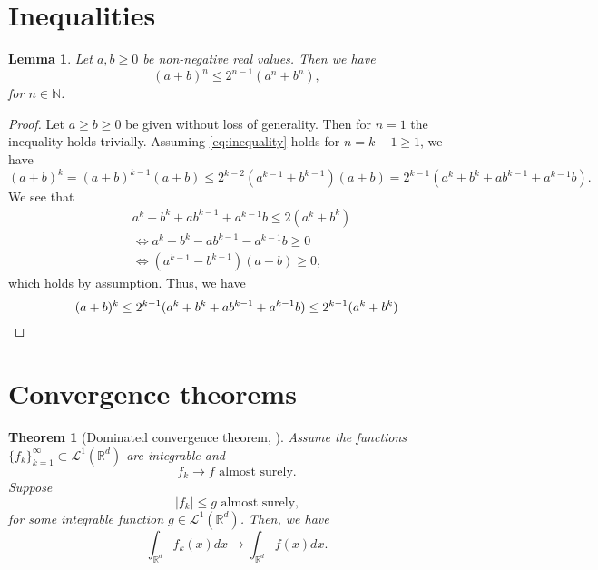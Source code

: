 \documentclass[12pt]{article}
\newtheorem{theorem}{Theorem}[section]
\newtheorem{lemma}[lemma]{Lemma}
\theoremstyle{definition}
\numberwithin{equation}{section}
\newcommand{\N}{\mathbb{N}}
\newcommand{\R}{\mathbb{R}}
\newcommand{\CL}{\mathcal{L}}
\begin{document}
\appendix
\section{Inequalities}
\begin{lemma}
  \label{lemma:inequality}
  Let $a,b \geq 0$ be non-negative real values. Then we have
  \begin{equation}
    \label{eq:inequality}
    \left(a+b\right)^n \leq 2^{n-1} \left( a^n + b^n \right),
  \end{equation}
  for $n \in \N$.
\end{lemma}
\begin{proof}
  Let $a \geq b \geq 0$ be given without loss of generality. Then for $n = 1$ the inequality holds trivially.
  Assuming \eqref{eq:inequality} holds for $n = k-1 \geq 1$, we have
  \begin{equation*}
    (a+b)^k = (a+b)^{k-1}(a+b) \leq 2^{k-2} (a^{k-1} + b^{k-1}) (a+b) = 2^{k-1}(a^k+b^k + ab^{k-1} + a^{k-1}b).
  \end{equation*}
  We see that
  \begin{align*}
    &a^k+b^k + ab^{k-1} + a^{k-1}b \leq 2 (a^k + b^k) \\
    &\iff a^k + b^k -ab^{k-1} - a^{k-1}b \geq 0 \\
    &\iff (a^{k-1} - b^{k-1}) (a-b) \geq 0,
  \end{align*}
  which holds by assumption. Thus, we have
  \begin{equation*}
    (a+b)^k \leq 2^{k-1}(a^k+b^k + ab^{k-1} + a^{k-1}b) \leq 2^{k-1} (a^k + b^k) \qedhere
  \end{equation*}
\end{proof}
\section{Convergence theorems}
\begin{theorem}[Dominated convergence theorem, ]
  \label{thm:dominated_convergence}
  Assume the functions $\{f_k\}_{k=1}^{\infty} \subset \CL^1(\R^d)$ are integrable and
  \begin{equation*}
    f_k \rightarrow f \text{ almost surely.}
  \end{equation*}
  Suppose
  \begin{equation*}
    |f_k| \leq g \text{ almost surely,}
  \end{equation*}
  for some integrable function $g \in \CL^1(\R^d)$. Then, we have
  \begin{equation*}
    \int_{\R^d} f_k(x) dx \rightarrow \int_{\R^d} f(x) dx.
  \end{equation*}
\end{theorem}
\end{document}

